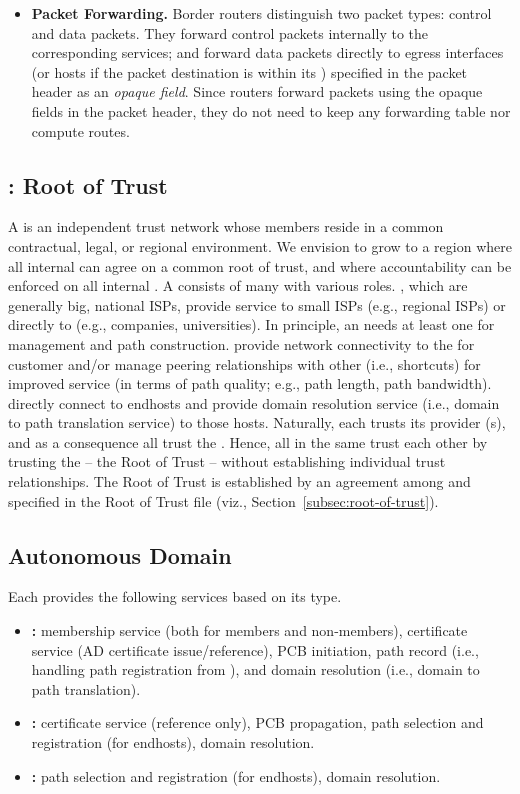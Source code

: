\begin{itemize}
\item {\bf Packet Forwarding. } Border routers distinguish two packet types:
  control and data packets. They forward control packets internally to the
  corresponding services; and forward data packets directly to egress interfaces
  (or hosts if the packet destination is within its \AD) specified in the packet
  header as an \textit{opaque field}. Since routers forward packets using the
  opaque fields in the packet header, they do not need to keep any forwarding
  table nor compute routes.
\end{itemize}

\subsection{\ISD: Root of Trust}

A \ISD is an independent {trust} network whose members reside in a common
contractual, legal, or regional environment. We envision \ISDs to grow to a
region where all internal \ADs can agree on a common root of trust, and where
accountability can be enforced on all internal \ADs. A \ISD consists of many \ADs
with various roles. \ISDC \ADs, which are generally big, national ISPs, provide
service to small ISPs (e.g., regional ISPs) or directly to \STUB \ADs (e.g.,
companies, universities). In principle, an \ISD needs at least one \ISDC \AD for
\ISD management and path construction. \TRAN \ADs provide network connectivity to
the \ISDC for customer \ADs and/or manage peering relationships with other \TRAN \ADs
(i.e., shortcuts) for improved service (in terms of path quality; e.g., path
length, path bandwidth). \STUB \ADs directly connect to endhosts and provide
domain resolution service (i.e., domain to path translation service) to those
hosts. Naturally, each \AD trusts its provider \AD(s), and as a consequence all
\ADs trust the \ISDC. Hence, all \STUB \ADs in the same \ISD trust each other by
trusting the \ISDC -- the Root of Trust -- without establishing individual trust
relationships. The Root of Trust is established by an agreement among \ISDC \ADs
and specified in the Root of Trust file (viz., Section~\ref{subsec:root-of-trust}).

\subsection{Autonomous Domain}
Each \AD provides the following services based on its type.
\begin{itemize}
\item {\bf \ISDC \AD: } \ISD membership service (both for \ISDC members and non-\ISDC members), certificate service (AD certificate issue/reference), PCB initiation, path record (i.e., handling path registration from \STUB \ADs), and domain resolution (i.e., domain to path translation).
\item {\bf \TRAN \AD: } certificate service (reference only), PCB propagation, path selection and registration (for endhosts), domain resolution.
\item {\bf \STUB \AD: } path selection and registration (for endhosts), domain resolution. 
\end{itemize}

